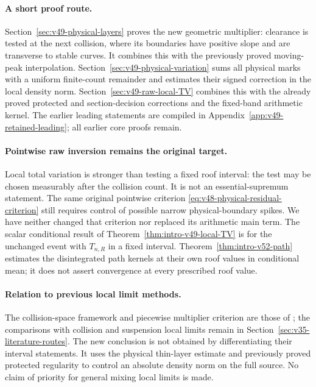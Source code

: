 \documentclass[11pt,reqno]{amsart}
\numberwithin{equation}{section}
\theoremstyle{definition}\newtheorem{definition}[theorem]{Definition}
\theoremstyle{remark}\newtheorem{remark}[theorem]{Remark}
\begin{document}
\paragraph{A short proof route.}
Section~\ref{sec:v49-physical-layers} proves the new geometric
multiplier: clearance is tested at the next collision, where its
boundaries have positive slope and are transverse to stable curves.
It combines this with the previously proved moving-peak interpolation.
Section~\ref{sec:v49-physical-variation} sums all physical marks
with a uniform finite-count remainder and estimates their signed
correction in the local density norm.
Section~\ref{sec:v49-raw-local-TV} combines this with the already
proved protected and section-decision corrections and the fixed-band
arithmetic kernel. The earlier leading statements are compiled in
Appendix~\ref{app:v49-retained-leading}; all earlier core proofs remain.

\paragraph{Pointwise raw inversion remains the original target.}
Local total variation is stronger than testing a fixed roof interval:
the test may be chosen measurably after the collision count. It is not
an essential-supremum statement. The same original pointwise criterion
\eqref{eq:v48-physical-residual-criterion} still requires control of
possible narrow physical-boundary spikes. We have neither changed that
criterion nor replaced its arithmetic main term. The scalar conditional result of Theorem~\ref{thm:intro-v49-local-TV}
is for the unchanged event with $T_{n,R}$ in a fixed interval.
Theorem~\ref{thm:intro-v52-path} estimates the disintegrated path
kernels at their own roof values in conditional mean; it does not
assert convergence at every prescribed roof value.

\paragraph{Relation to previous local limit methods.}
The collision-space framework and piecewise multiplier criterion are
those of \cite{DZ11,DZ,DPZ}; the comparisons with collision and
suspension local limits remain in
Section~\ref{sec:v35-literature-routes}. The new conclusion is not
obtained by differentiating their interval statements. It uses the
physical thin-layer estimate and previously proved protected
regularity to control an absolute density norm on the full source.
No claim of priority for general mixing local limits is made.
\end{document}
